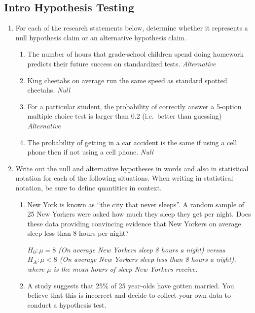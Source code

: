 \documentclass[12pt]{article}   	%
\newcommand{\soln}[2]{\textit{\textcolor{custom_red}{#2}}}{}
\begin{document}
\subsection*{Intro Hypothesis Testing }

\begin{enumerate}
\item
  For each of the research statements below, determine whether it
  represents a null hypothesis claim or an alternative hypothesis claim.

  \begin{enumerate}
  \item
    The number of hours that grade-school children spend doing homework
    predicts their future success on standardized tests. \soln{}{Alternative}
  \item
    King cheetahs on average run the same speed as standard spotted
    cheetahs. \soln{}{Null}
  \item
    For a particular student, the probability of correctly answer a
    5-option multiple choice test is larger than 0.2 (i.e.~better than
    guessing)  \soln{}{Alternative}
  \item
    The probability of getting in a car accident is the same if using a
    cell phone then if not using a cell phone. \soln{}{Null}
  \end{enumerate}
   
  \item
  Write out the null and alternative hypotheses in words and also in
  statistical notation for each of the following situations. When
  writing in statistical notation, be sure to define quantities in
  context.

  \begin{enumerate}
  \item
    New York is known as ``the city that never sleeps''. A random sample
    of 25 New Yorkers were asked how much they sleep they get per night.
    Does these data providing convincing evidence that New Yorkers on
    average sleep less than 8 hours per night?
    
    \soln{}{$H_{0}: \mu = 8$ (On average New Yorkers sleep 8 hours a night) versus $H_{A}: \mu < 8$ (On average New Yorkers sleep less than 8 hours a night), where $\mu$ is the mean hours of sleep New Yorkers receive. }
    
  \item
    A study suggests that 25\% of 25 year-olds have gotten married. You
    believe that this is incorrect and decide to collect your own data
    to conduct a hypothesis test.
    

\end{enumerate}
\end{enumerate}
\end{document}
